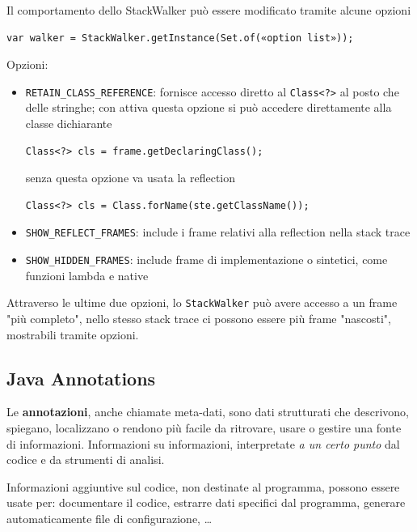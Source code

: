 Il comportamento dello StackWalker può essere modificato tramite alcune opzioni
\begin{verbatim}
var walker = StackWalker.getInstance(Set.of(«option list»));
\end{verbatim}
Opzioni:
\begin{itemize}
    \item \texttt{RETAIN\_CLASS\_REFERENCE}: fornisce accesso diretto al \texttt{Class<?>} al posto che delle stringhe; con attiva questa opzione si può accedere direttamente alla classe dichiarante
    \begin{verbatim}
Class<?> cls = frame.getDeclaringClass();
    \end{verbatim}
    senza questa opzione va usata la reflection
    \begin{verbatim}
Class<?> cls = Class.forName(ste.getClassName());
    \end{verbatim}

    \item \texttt{SHOW\_REFLECT\_FRAMES}: include i frame relativi alla reflection nella stack trace

    \item \texttt{SHOW\_HIDDEN\_FRAMES}: include frame di implementazione o sintetici, come funzioni lambda e native
\end{itemize}

Attraverso le ultime due opzioni, lo \texttt{StackWalker} può avere accesso a un frame "più completo", nello stesso stack trace ci possono essere più frame "nascosti", mostrabili tramite opzioni.

\subsection{Java Annotations}

Le \textbf{annotazioni}, anche chiamate meta-dati, sono dati strutturati che descrivono, spiegano, localizzano o rendono più facile da ritrovare, usare o gestire una fonte di informazioni. Informazioni su informazioni, interpretate \textit{a un certo punto} dal codice e da strumenti di analisi.

Informazioni aggiuntive sul codice, non destinate al programma, possono essere usate per: documentare il codice, estrarre dati specifici dal programma, generare automaticamente file di configurazione, \dots


